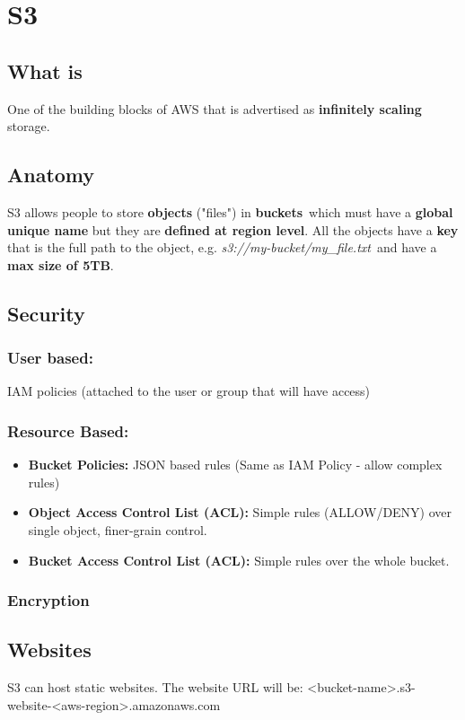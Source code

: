 \section{S3}\label{sec:s3}

\subsection{What is}\label{subsec:what-is-s3}
One of the building blocks of AWS that is advertised as \textbf{infinitely scaling} storage.

\subsection{Anatomy}\label{subsec:anatomy}
S3 allows people to store \textbf{objects} ("files") in \textbf{buckets}\, which must have a \textbf{global unique name} but they are \textbf{defined at region level}\@.
All the objects have a \textbf{key} that is the full path to the object, e.g. \textit{s3://my-bucket/my\_file.txt}\, and have a \textbf{max size of 5TB}\@.

\subsection{Security}\label{subsec:security}

\subsubsection{User based:} IAM policies (attached to the user or group that will have access)
\subsubsection{Resource Based:}
\begin{itemize}
	\item \textbf{Bucket Policies:} JSON based rules (Same as IAM Policy - allow complex rules)
	\item \textbf{Object Access Control List (ACL):} Simple rules (ALLOW/DENY) over single object, finer-grain control.
	\item \textbf{Bucket Access Control List (ACL):} Simple rules over the whole bucket.
\end{itemize}
\subsubsection{Encryption}

\subsection{Websites}\label{subsec:websites}
S3 can host static websites.
The website URL will be: <bucket-name>.s3-website-<aws-region>.amazonaws.com

